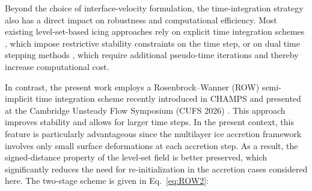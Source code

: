 

Beyond the choice of interface-velocity formulation, the time-integration strategy also has a direct impact on robustness and computational efficiency. Most existing level-set-based icing approaches rely on explicit time integration schemes \cite{PENA2016278,lavoieLevelSet}, which impose restrictive stability constraints on the time step, or on dual time stepping methods \cite{bourgault-coteMultilayerAirfoilIce2019}, which require additional pseudo-time iterations and thereby increase computational cost.

In contrast, the present work employs a Rosenbrock--Wanner (ROW) semi-implicit time integration scheme \cite{hairer1996} recently introduced in CHAMPS and presented at the Cambridge Unsteady Flow Symposium (CUFS 2026) \cite{CUFS2026}. This approach improves stability and allows for larger time steps. In the present context, this feature is particularly advantageous since the multilayer ice accretion framework involves only small surface deformations at each accretion step. As a result, the signed-distance property of the level-set field is better preserved, which significantly reduces the need for re-initialization in the accretion cases considered here. The two-stage scheme is given in Eq.~\ref{eq:ROW2}:

